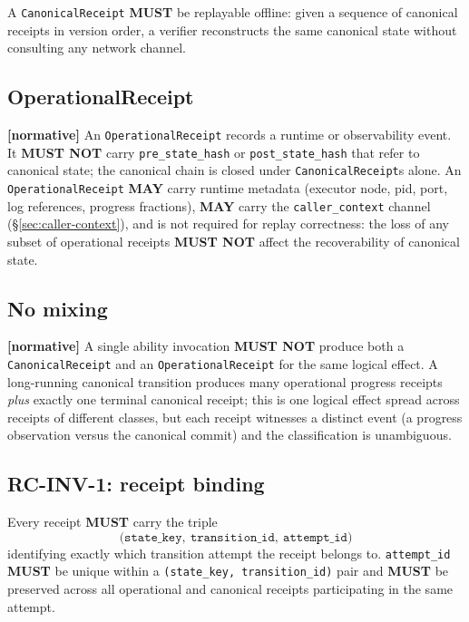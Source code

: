 \documentclass[11pt,a4paper]{article}
\newcommand{\normsv}{\textcolor{normativecolor}{\textbf{[normative]}}\xspace}
\theoremstyle{definition}
\begin{document}
A \texttt{CanonicalReceipt} \textbf{MUST} be replayable offline:
given a sequence of canonical receipts in version order, a verifier
reconstructs the same canonical state without consulting any
network channel.

\subsection{OperationalReceipt}

\normsv{}
An \texttt{OperationalReceipt} records a runtime or observability
event. It \textbf{MUST NOT} carry \texttt{pre\_state\_hash} or
\texttt{post\_state\_hash} that refer to canonical state; the
canonical chain is closed under \texttt{CanonicalReceipt}s alone.
An \texttt{OperationalReceipt} \textbf{MAY} carry runtime metadata
(executor node, pid, port, log references, progress fractions),
\textbf{MAY} carry the \texttt{caller\_context} channel
(\S\ref{sec:caller-context}), and is not required for replay
correctness: the loss of any subset of operational receipts
\textbf{MUST NOT} affect the recoverability of canonical state.

\subsection{No mixing}

\normsv{}
A single ability invocation \textbf{MUST NOT} produce both a
\texttt{CanonicalReceipt} and an \texttt{OperationalReceipt} for
the same logical effect. A long-running canonical transition
produces many operational progress receipts \emph{plus} exactly
one terminal canonical receipt; this is one logical effect spread
across receipts of different classes, but each receipt witnesses a
distinct event (a progress observation versus the canonical
commit) and the classification is unambiguous.

\subsection{RC-INV-1: receipt binding}
\label{sec:receipt-binding}

\begin{invariant}[RC-INV-1]
Every receipt \textbf{MUST} carry the triple
\[
    \bigl(\texttt{state\_key},\ \texttt{transition\_id},\ \texttt{attempt\_id}\bigr)
\]
identifying exactly which transition attempt the receipt belongs
to. \texttt{attempt\_id} \textbf{MUST} be unique within a
\texttt{(state\_key,\ transition\_id)} pair and \textbf{MUST} be
preserved across all operational and canonical receipts
participating in the same attempt.
\end{invariant}
\end{document}
